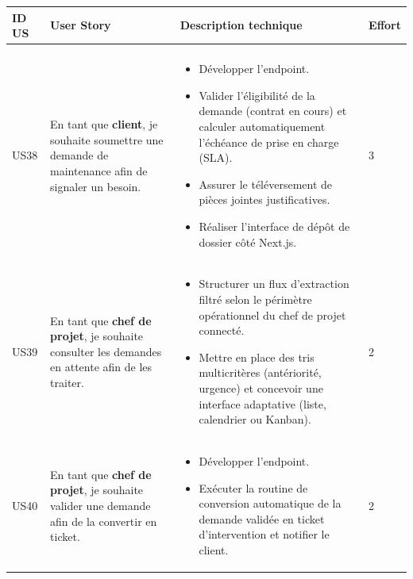 ﻿
\renewcommand{\arraystretch}{1.3}
\small
\begin{longtable}{|C{1cm}|L{5.6cm}|L{8cm}|C{0.85cm}|}
\hline
\textbf{ID US} & \textbf{User Story} & \textbf{Description technique} & \textbf{Effort} \\
\hline
\endfirsthead

\hline

\endhead

\hline
\endfoot

\hline
\endlastfoot

 \\
\hline

US38 & En tant que \textbf{client}, je souhaite soumettre une demande de maintenance afin de signaler un besoin. &
\begin{itemize}[nosep, left=0pt, label={$\bullet$}]
\item Développer l'endpoint.
\item Valider l'éligibilité de la demande (contrat en cours) et calculer automatiquement l'échéance de prise en charge (SLA).
\item Assurer le téléversement de pièces jointes justificatives.
\item Réaliser l'interface de dépôt de dossier côté Next.js.
\end{itemize} & 3 \\
\hline

US39 & En tant que \textbf{chef de projet}, je souhaite consulter les demandes en attente afin de les traiter. &
\begin{itemize}[nosep, left=0pt, label={$\bullet$}]
\item Structurer un flux d'extraction filtré selon le périmètre opérationnel du chef de projet connecté.
\item Mettre en place des tris multicritères (antériorité, urgence) et concevoir une interface adaptative (liste, calendrier ou Kanban).
\end{itemize} & 2 \\
\hline

US40 & En tant que \textbf{chef de projet}, je souhaite valider une demande afin de la convertir en ticket. &
\begin{itemize}[nosep, left=0pt, label={$\bullet$}]
\item Développer l'endpoint.
\item Exécuter la routine de conversion automatique de la demande validée en ticket d'intervention et notifier le client.
\end{itemize} & 2 \\
\hline


\end{longtable}
